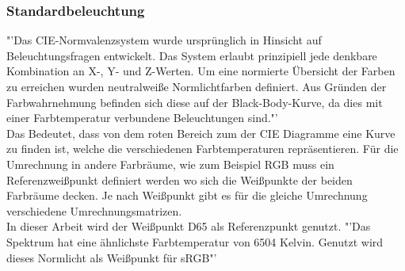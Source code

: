 \documentclass[11pt]{scrartcl}
\begin{document}
\subsubsection{Standardbeleuchtung} \label{whiteRef}
"'Das CIE-Normvalenzsystem wurde ursprünglich in Hinsicht auf Beleuchtungsfragen entwickelt. Das System erlaubt prinzipiell jede denkbare Kombination an X-, Y-
und Z-Werten. Um eine normierte Übersicht der Farben zu erreichen wurden neutralweiße Normlichtfarben definiert. Aus Gründen der Farbwahrnehmung befinden sich diese
auf der Black-Body-Kurve, da dies mit einer Farbtemperatur verbundene Beleuchtungen sind."' \cite{wikipediaCIE}\\
Das Bedeutet, dass von dem roten Bereich zum der CIE Diagramme eine Kurve zu finden ist, welche die verschiedenen Farbtemperaturen repräsentieren. Für die Umrechnung
in andere Farbräume, wie zum Beispiel RGB muss ein Referenzweißpunkt definiert werden wo sich die Weißpunkte der beiden Farbräume decken. Je nach Weißpunkt gibt es 
für die gleiche Umrechnung verschiedene Umrechnungsmatrizen.\\
In dieser Arbeit wird der Weißpunkt D65 als Referenzpunkt genutzt. "'Das Spektrum hat eine ähnlichste Farbtemperatur von 6504 Kelvin. Genutzt wird dieses Normlicht als Weißpunkt für sRGB"' \cite{wikipediaCIE}
\end{document}

